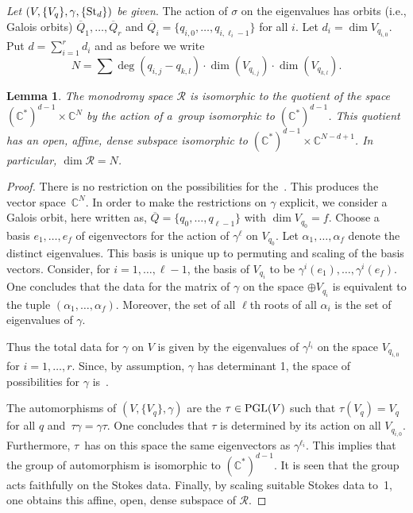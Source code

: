 \documentclass[pdftex]{sigma}
\numberwithin{equation}{section}
\newtheorem{Lemma}[Theorem]{Lemma}
\begin{document}
{\it Let $(V,\{V_q\},\gamma ,\{{\rm St}_d\})$ be given}. The action of $\sigma $ on the eigenvalues has orbits (i.e., Galois orbits)
$\overline{Q}_1,\dots ,\overline{Q}_r$ and $\overline{Q}_i=\{q_{i,0},\dots ,q_{i,\ell_i-1}\}$ for all $i$. Let $d_i=\dim V_{q_{i,0}}$.
Put $d=\sum _{i=1}^rd_i $ and as before we write
\[
N=\sum \deg ( q_{i,j}-q_{k,l})\cdot \dim (V_{q_{i,j}})\cdot \dim (V_{q_{k,l}}).\]

\begin{Lemma} \label{lemma01} The monodromy space $\mathcal{R}$ is isomorphic to the quotient of the space $(\mathbb{C}^*)^{d-1}\times \mathbb{C}^N$ by the
 action of a~group isomorphic to $(\mathbb{C}^*)^{d-1}$. This quotient has an open, affine, dense subspace
 isomorphic to $(\mathbb{C}^*)^{d-1}\times \mathbb{C}^{N-d+1}$. In particular, $\dim \mathcal{R}=N$.
\end{Lemma}
\begin{proof} There is no restriction on the possibilities for the~. This produces the vector space~$\mathbb{C}^N$.
In order to make the restrictions on $\gamma$ explicit, we consider a Galois orbit, here written as,
$\overline{Q}=\{q_0,\dots ,q_{\ell -1}\}$ with $\dim V_{q_0}=f$. Choose a basis
$e_{1},\dots, e_{f}$ of eigenvectors for the action of $\gamma^\ell$ on $V_{q_0}$. Let $\alpha_1,\dots ,\alpha_f$ denote the
distinct eigenvalues. This basis is unique up to permuting and scaling of the basis vectors. Consider, for $i=1,\dots, \ell -1$, the basis of $V_{q_i}$ to be $\gamma ^i(e_1),\dots , \gamma ^i(e_f)$. One concludes that the data for the matrix of $\gamma$
on the space $\oplus V_{q_i}$ is equivalent to the tuple $(\alpha_1,\dots ,\alpha_f)$. Moreover, the set of all $\ell$th roots of all $\alpha _i$ is the set of eigenvalues of $\gamma$.

Thus the total data for $\gamma$ on $V$ is given by the eigenvalues of $\gamma^{l_i}$ on the space $ V_{q_{i,0}}$ for $i=1,\dots ,r$.
 Since, by assumption, $\gamma$ has determinant 1, the space of possibilities for $\gamma$ is~.


The automorphisms of $(V,\{V_q\},\gamma)$ are the $\tau \in {\rm PGL}(V)$ such that $\tau(V_q)=V_q$ for all $q$ and~${\tau \gamma=\gamma \tau}$. One concludes that $\tau$ is determined by its action on all $V_{q_{i,0}}$. Furthermore,
$\tau$~has on this space the same eigenvectors as $\gamma ^{\ell_i}$. This implies that the group of automorphism
is isomorphic to $(\mathbb{C}^*)^{d-1}$. It is seen that the group acts faithfully on the Stokes data. Finally, by scaling
suitable Stokes data to~1, one obtains this affine, open, dense subspace of $\mathcal{R}$.
\end{proof}
\end{document}

